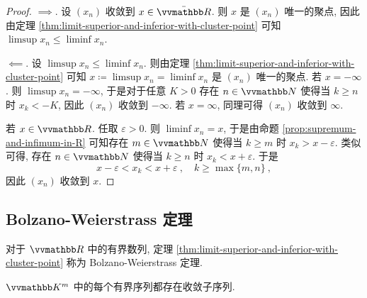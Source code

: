 \begin{proof}
    \(\implies\). 设 \((x_n)\) 收敛到 \(x \in \bar \R\). 则 \(x\) 是 \((x_n)\) 唯一的聚点, 因此由定理 \ref{thm:limit-superior-and-inferior-with-cluster-point} 可知 \(\limsup x_n \leq \liminf x_n\).

    \(\impliedby\). 设 \(\limsup x_n \leq \liminf x_n\). 则由定理 \ref{thm:limit-superior-and-inferior-with-cluster-point} 可知 \(x \coloneqq \limsup x_n = \liminf x_n\) 是 \((x_n)\) 唯一的聚点. 若 \(x = - \infty\). 则 \(\limsup x_n = - \infty\), 于是对于任意 \(K > 0\) 存在 \(n \in \N\) 使得当 \(k \geq n\) 时 \(x_k < - K\), 因此 \((x_n)\) 收敛到 \(- \infty\). 若 \(x = \infty\), 同理可得 \((x_n)\) 收敛到 \(\infty\).

    若 \(x \in \R\). 任取 \(\varepsilon > 0\). 则 \(\liminf x_n = x\), 于是由命题 \ref{prop:supremum-and-infimum-in-R} 可知存在 \(m \in \N\) 使得当 \(k \geq m\) 时 \(x_k > x - \varepsilon\). 类似可得, 存在 \(n \in \N\) 使得当 \(k \geq n\) 时 \(x_k < x + \varepsilon\). 于是
    \[
        x - \varepsilon < x_k < x + \varepsilon\ ,\quad k \geq \max\{m, n\}\ ,
    \]
    因此 \((x_n)\) 收敛到 \(x\).
\end{proof}

\subsection{Bolzano-Weierstrass 定理}

对于 \(\R\) 中的有界数列, 定理 \ref{thm:limit-superior-and-inferior-with-cluster-point} 称为 Bolzano-Weierstrass 定理.

\begin{theorem}
    \(\K^m\) 中的每个有界序列都存在收敛子序列.
\end{theorem}

